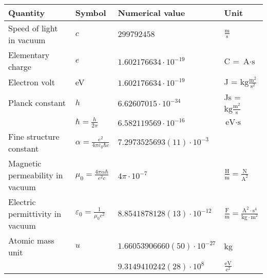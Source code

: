 \begin{tabular}{llll}
\hline
Quantity                        & Symbol & Numerical value                              & Unit \\
\hline
Speed of light in vacuum        & $c$             & $299792458$                         & $\frac{\text{m}}{\text{s}}$                  \\
Elementary charge               & $e$             & $1.602176634 \cdot 10^{-19}$        & C = $\text{A}\cdot\text{s}$                  \\
Electron volt                   &  eV             & $1.602176634 \cdot 10^{-19}$        & J = $\text{kg}\frac{\text{m}^2}{\text{s}^2}$ \\
Planck constant                 & $h$             & $6.62607015 \cdot 10^{-34}$         & Js = $\text{kg}\frac{\text{m}^2}{\text{s}}$  \\
                                & $\hbar = \frac{h}{2\pi}$ 
                                                  & $6.582119569 \cdot 10^{-16}$        & $\text{eV} \cdot \text{s}$  \\
Fine structure constant         & $\alpha = \frac{e^2}{4\pi \varepsilon_0 \hbar c}$     
                                                  & $7.2973525693(11) \cdot 10^{-3}$    &   \\
Magnetic permeability in vacuum & $\mu_0 = \frac{4\pi \alpha \hbar}{e^2 c}$ 
                                                  & $4\pi \cdot 10^{-7}$     & $\frac{\text{H}}{\text{m}} = \frac{\text{N}}{\text{A}^2}$ \\ 
Electric permittivity in vacuum & $\varepsilon_0 = \frac{1}{\mu_0 c^2}$ 
                                                  & $8.8541878128(13) \cdot 10^{-12}$   & $\frac{\text{F}}{\text{m}} = \frac{\text{A}^2\cdot\text{s}^4}{\text{kg}\cdot\text{m}^2}$ \\
Atomic mass unit                & $u$             & $1.66053906660(50) \cdot 10^{-27}$  & kg                                           \\
                                &                 & $9.3149410242(28) \cdot 10^{8}$     & $\frac{\text{eV}}{\text{c}^2}$               \\
\hline
\end{tabular}